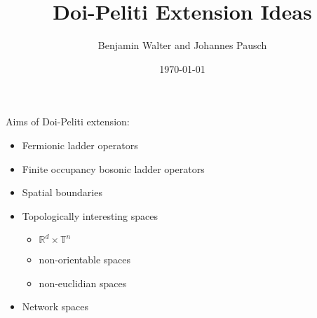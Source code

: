 \documentclass[11pt, oneside]{article}
\title{Doi-Peliti Extension Ideas}
\author{Benjamin Walter and Johannes Pausch}
\date{\today}
\begin{document}
\maketitle
Aims of Doi-Peliti extension:\begin{itemize}
\item Fermionic ladder operators 
\item Finite occupancy bosonic ladder operators
\item Spatial boundaries
\item Topologically interesting spaces
	\begin{itemize}
	\item $\mathbb{R}^d\times\mathbb{T}^n$
	\item non-orientable spaces
	\item non-euclidian spaces
	\end{itemize}
\item Network spaces
\end{itemize}
\end{document}
